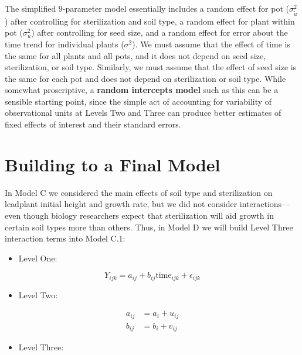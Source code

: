 \documentclass[
]{krantz}
\providecommand{\tightlist}{%
  \setlength{\itemsep}{0pt}\setlength{\parskip}{0pt}}
\begin{document}
The simplified 9-parameter model essentially includes a random effect for pot (\(\sigma_{\tilde{u}}^{2}\)) after controlling for sterilization and soil type, a random effect for plant within pot (\(\sigma_{u}^{2}\)) after controlling for seed size, and a random effect for error about the time trend for individual plants (\(\sigma^{2}\)). We must assume that the effect of time is the same for all plants and all pots, and it does not depend on seed size, sterilization, or soil type. Similarly, we must assume that the effect of seed size is the same for each pot and does not depend on sterilization or soil type. While somewhat proscriptive, a \textbf{random intercepts model} such as this can be a sensible starting point, since the simple act of accounting for variability of observational units at Levels Two and Three can produce better estimates of fixed effects of interest and their standard errors.

\section{Building to a Final Model}\label{modelsDEF}

In Model C we considered the main effects of soil type and sterilization on leadplant initial height and growth rate, but we did not consider interactions---even though biology researchers expect that sterilization will aid growth in certain soil types more than others. Thus, in Model D we will build Level Three interaction terms into Model C.1:

\begin{itemize}
\tightlist
\item
  Level One:
\end{itemize}

\begin{equation*}
Y_{ijk} = a_{ij}+b_{ij}\textrm{time}_{ijk}+\epsilon_{ijk}
\end{equation*}

\begin{itemize}
\tightlist
\item
  Level Two:
\end{itemize}

\begin{align*}
a_{ij} & = a_{i}+u_{ij} \\
b_{ij} & = b_{i}+v_{ij}
\end{align*}

\begin{itemize}
\tightlist
\item
  Level Three:
\end{itemize}
\end{document}
